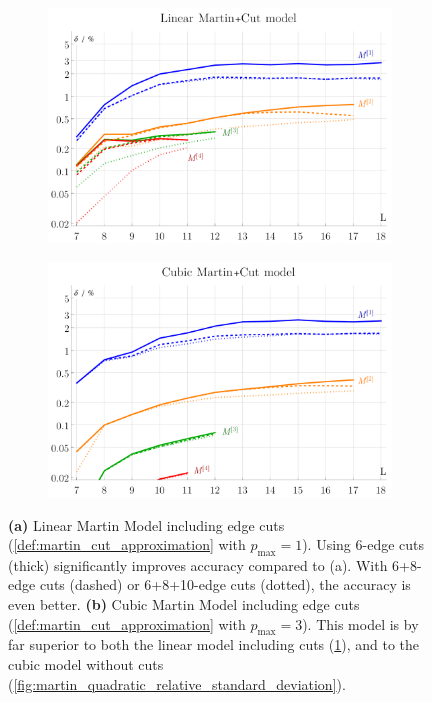 \documentclass[11pt]{scrartcl}
\numberwithin{equation}{section}
\begin{document}
\begin{figure}[htb]
	
	\begin{subfigure}{ .49 \linewidth}
		\centering
		\includegraphics[width=\linewidth]{figures/martin_cut_linear}
		\subcaption{}
		\label{fig:martin_cut_linear}
	\end{subfigure}
	\begin{subfigure}{ .49 \linewidth}
		\centering
		\includegraphics[width=\linewidth]{figures/martin_cut_cubic}
		\subcaption{}
		\label{fig:martin_cut_cubic}
	\end{subfigure}
	\caption{ 
	 	\textbf{(a)} Linear Martin Model including edge cuts (\cref{def:martin_cut_approximation} with $p_\text{max}=1$).  Using 6-edge cuts (thick) significantly improves accuracy compared to (a). With 6+8-edge cuts (dashed) or 6+8+10-edge cuts (dotted), the accuracy is even better.
		\textbf{(b)} Cubic Martin Model including edge cuts (\cref{def:martin_cut_approximation} with $p_\text{max}=3$). This model is by far superior to both the linear model including cuts (\cref{fig:martin_cut_linear}), and to the cubic model without cuts (\cref{fig:martin_quadratic_relative_standard_deviation}). }
	\label{fig:martin_cut}
\end{figure}
\end{document}
